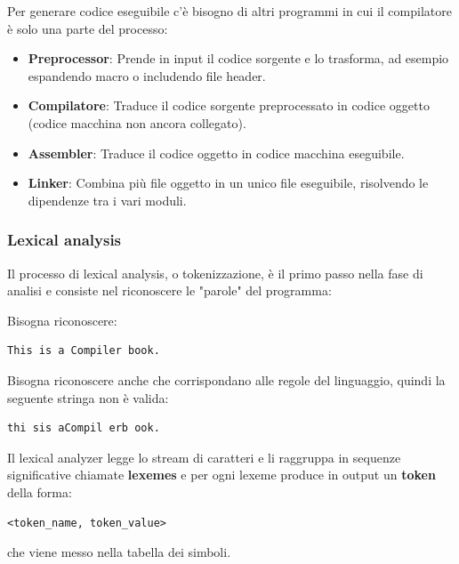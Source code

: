 \documentclass[a4paper]{article}
\begin{document}
\noindent
Per generare codice eseguibile c'è bisogno di altri programmi in cui il compilatore
è solo una parte del processo:
\begin{itemize}
  \item \textbf{Preprocessor}: Prende in input il codice sorgente e lo trasforma, ad esempio
    espandendo macro o includendo file header.

  \item \textbf{Compilatore}: Traduce il codice sorgente preprocessato in codice
    oggetto (codice macchina non ancora collegato).

  \item \textbf{Assembler}: Traduce il codice oggetto in codice macchina eseguibile.

  \item \textbf{Linker}: Combina più file oggetto in un unico file eseguibile,
    risolvendo le dipendenze tra i vari moduli.
\end{itemize}

\subsubsection{Lexical analysis}
Il processo di lexical analysis, o tokenizzazione, è il primo passo nella fase di analisi
e consiste nel riconoscere le "parole" del programma:

\begin{example}
  Bisogna riconoscere:
\begin{lstlisting}[numbers=none]
This is a Compiler book.
\end{lstlisting}
  Bisogna riconoscere anche che corrispondano alle regole del linguaggio, quindi 
  la seguente stringa non è valida:
\begin{lstlisting}[numbers=none]
thi sis aCompil erb ook.
\end{lstlisting}
\end{example}

Il lexical analyzer legge lo stream di caratteri e li raggruppa in sequenze significative
chiamate \textbf{lexemes} e per ogni lexeme produce in output un \textbf{token}
della forma:
\begin{lstlisting}[numbers=none]
  <token_name, token_value>
\end{lstlisting}
che viene messo nella tabella dei simboli.
\end{document}
